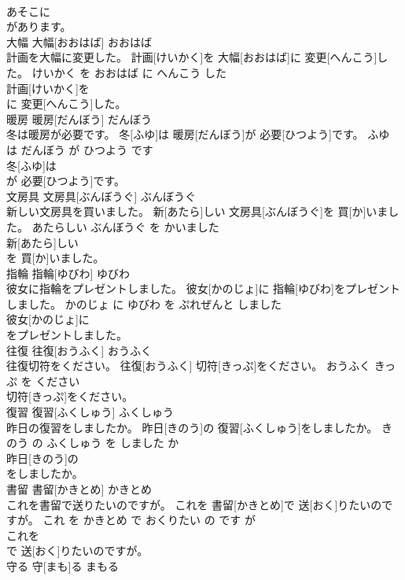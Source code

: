 \documentclass[8pt]{extreport}
\begin{document}
\begin{CJK}{UTF8}{min}
\\	あそこに
\\	があります。			
\\	大幅	大幅[おおはば]	おおはば	
\\	計画を大幅に変更した。	計画[けいかく]を 大幅[おおはば]に 変更[へんこう]した。	けいかく を おおはば に へんこう した	
\\	計画[けいかく]を
\\	に 変更[へんこう]した。			
\\	暖房	暖房[だんぼう]	だんぼう	
\\	冬は暖房が必要です。	冬[ふゆ]は 暖房[だんぼう]が 必要[ひつよう]です。	ふゆ は だんぼう が ひつよう です	
\\	冬[ふゆ]は
\\	が 必要[ひつよう]です。			
\\	文房具	文房具[ぶんぼうぐ]	ぶんぼうぐ	
\\	新しい文房具を買いました。	新[あたら]しい 文房具[ぶんぼうぐ]を 買[か]いました。	あたらしい ぶんぼうぐ を かいました	
\\	新[あたら]しい
\\	を 買[か]いました。			
\\	指輪	指輪[ゆびわ]	ゆびわ	
\\	彼女に指輪をプレゼントしました。	彼女[かのじょ]に 指輪[ゆびわ]をプレゼントしました。	かのじょ に ゆびわ を ぷれぜんと しました	
\\	彼女[かのじょ]に
\\	をプレゼントしました。			
\\	往復	往復[おうふく]	おうふく	
\\	往復切符をください。	往復[おうふく] 切符[きっぷ]をください。	おうふく きっぷ を ください	
\\	切符[きっぷ]をください。			
\\	復習	復習[ふくしゅう]	ふくしゅう	
\\	昨日の復習をしましたか。	昨日[きのう]の 復習[ふくしゅう]をしましたか。	きのう の ふくしゅう を しました か	
\\	昨日[きのう]の
\\	をしましたか。			
\\	書留	書留[かきとめ]	かきとめ	
\\	これを書留で送りたいのですが。	これを 書留[かきとめ]で 送[おく]りたいのですが。	これ を かきとめ で おくりたい の です が	
\\	これを
\\	で 送[おく]りたいのですが。			
\\	守る	守[まも]る	まもる	

\end{CJK}
\end{document}
